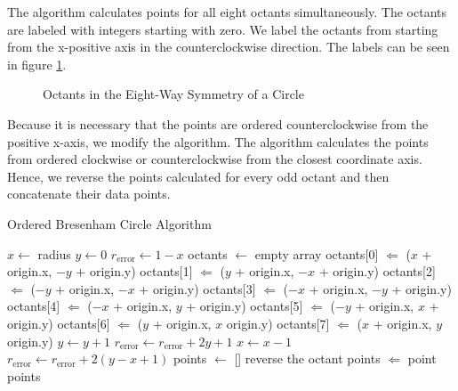 \documentclass{sig-alternate}
\begin{document}
		The algorithm calculates points for all eight octants simultaneously.
		The octants are labeled with integers starting with zero. We label the
		octants from starting from the x-positive axis in the counterclockwise
		direction. The labels can be seen in figure \ref{fig:eightsymmetry}.
		\begin{figure}[htp]
			\centering
			
			\caption{Octants in the Eight-Way Symmetry of a Circle}
			\label{fig:eightsymmetry}
		\end{figure}
		Because it is necessary that the points are ordered
		counterclockwise from the positive x-axis, we modify the
		algorithm. The algorithm calculates the points from ordered
		clockwise or counterclockwise from the closest coordinate axis.
		Hence, we reverse the points calculated for every odd octant and
		then concatenate their data points.

		\begin{algorithm}[htp!]
			\caption{Ordered Bresenham Circle Algorithm}
			\begin{algorithmic}
					\State $x \gets$ radius
					\State $y \gets 0$
					\State $r_{\text{error}} \gets 1 - x$
					\State octants $\gets$ empty array
						\State octants[0] $\Leftarrow$ ($x$ + origin.x, $-y$ + origin.y)
						\State octants[1] $\Leftarrow$ ($y$ + origin.x, $-x$ + origin.y)
						\State octants[2] $\Leftarrow$ ($-y$ + origin.x, $-x$ + origin.y)
						\State octants[3] $\Leftarrow$ ($-x$ + origin.x, $-y$ + origin.y)
						\State octants[4] $\Leftarrow$ ($-x$ + origin.x, $y$ + origin.y)
						\State octants[5] $\Leftarrow$ ($-y$ + origin.x, $x$ + origin.y)
						\State octants[6] $\Leftarrow$ ($y$ + origin.x, $x$ origin.y)
						\State octants[7] $\Leftarrow$ ($x$ + origin.x, $y$ origin.y)
						\State $y \gets y + 1$
							\State $r_{\text{error}} \gets r_{\text{error}} + 2y + 1$
						\Else
							\State $x \gets x - 1$
							\State $r_{\text{error}} \gets r_{\text{error}} + 2(y - x + 1)$
						\EndIf
					\EndWhile
					\State points $\gets$ []
							\State reverse the octant
						\EndIf
							\State points $\Leftarrow$ point
						\EndFor
					\EndFor
					\State \Return points
				\EndProcedure
			\end{algorithmic}
		\end{algorithm}

\end{document}
